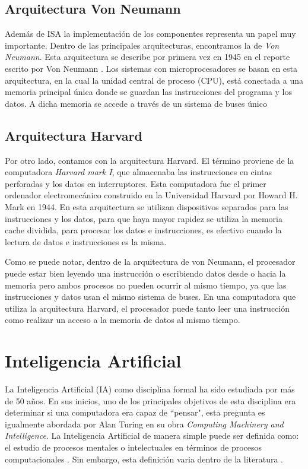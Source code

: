 \subsection{Arquitectura Von Neumann}

Adem\'{a}s de ISA la implementaci\'{o}n de los componentes representa un papel muy importante. Dentro de las principales arquitecturas, encontramos la de \emph{Von Neumann}. Esta arquitectura se describe por primera vez en 1945 en el reporte escrito por Von Neumann \cite{von1993first}. Los sistemas con microprocesadores se basan en esta arquitectura, en la cual la unidad central de proceso (CPU), está conectada a una memoria principal única donde se guardan las instrucciones del programa y los datos. A dicha memoria se accede a través de un sistema de buses único

\subsection{Arquitectura Harvard}

 Por otro lado, contamos con la arquitectura Harvard. El término proviene de la computadora \emph{Harvard mark I}, que almacenaba las instrucciones en cintas perforadas y los datos en interruptores. Esta computadora fue el primer ordenador electromecánico construido en la Universidad Harvard por Howard H. Mark en 1944. En esta arquitectura se utilizan dispositivos separados para las instrucciones y los datos, para  que haya mayor rapidez se utiliza la memoria cache dividida, para procesar los datos e instrucciones, es efectivo cuando la lectura de datos e instrucciones es la misma.
 
 Como se puede notar, dentro de la arquitectura de von Neumann, el procesador puede estar bien leyendo una instrucción o escribiendo datos desde o hacia la memoria pero ambos procesos no pueden ocurrir al mismo tiempo, ya que las instrucciones y datos usan el mismo sistema de buses. En una computadora que utiliza la arquitectura Harvard, el procesador puede tanto leer una instrucción como realizar un acceso a la memoria de datos al mismo tiempo.

\section{Inteligencia Artificial}

La Inteligencia Artificial (IA) como disciplina formal  ha sido estudiada por más de 50 años. En sus inicios, uno de los principales objetivos de esta disciplina era determinar si una computadora era capaz de “pensar", esta pregunta es igualmente abordada por Alan Turing\cite{turing1950computing} en su obra \emph{Computing Machinery and Intelligence}. La Inteligencia Artificial de manera simple puede ser definida como: el estudio de procesos mentales o intelectuales en t\'{e}rminos de procesos computacionales \cite{aimodern}. Sin embargo, esta definici\'{o}n varia dentro de la literatura \cite{haugeland1985,bellman1978,winston1992learning}. 

